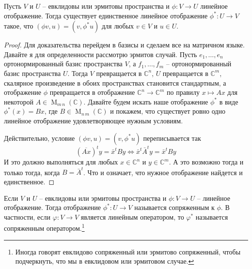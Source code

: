 \begin{claim}
Пусть $V$ и $U$ -- евклидовы или эрмитовы пространства и $\phi\colon V\to U$ линейное отображение. Тогда существует единственное линейное отображение $\phi^*\colon U\to V$ такое, что $(\phi v, u) = (v, \phi^* u)$ для любых $v\in V$ и $u\in U$.
\end{claim}
\begin{proof}
Для доказательства перейдем в базисы и сделаем все на матричном языке. Давайте я для определенности рассмотрю эрмитов случай. Пусть $e_1,\ldots,e_n$ ортонормированный базис пространства $V$, а $f_1,\ldots,f_m$ -- ортонормированный базис пространства $U$. Тогда $V$ превращается в $\mathbb C^n$, $U$ превращается в $\mathbb C^m$, скалярное произведение в обоих пространствах становится стандартным, а отображение $\phi$ превращается в отображение $\mathbb C^n \to \mathbb C^m$ по правилу $x \mapsto Ax$ для некоторой $A\in\operatorname{M}_{m\,n}(\mathbb C)$. Давайте будем искать наше отображение $\phi^*$  в виде $\phi^*(x) = Bx$, где $B\in \operatorname{M}_{n\,m}(\mathbb C)$ и покажем, что существует ровно одно линейное отображение удовлетворяющее нужным условиям.

Действительно, условие $(\phi v, u) = (v, \phi^* u)$ переписывается так
\[
(\overline{Ax})^t y = \bar x^t By\iff \bar x^t \bar A^t y = \bar x^t B y
\]
И это должно выполняться для любых $x\in \mathbb C^n$ и $y\in \mathbb C^m$. А это возможно тогда и только тогда, когда $B = \bar A^t$. Что и означает, что нужное отображение найдется и единственное.
\end{proof}

\begin{definition}
Если $V$ и $U$ -- евклидовы или эрмитовы пространства и $\phi\colon V\to U$ -- линейное отображение. Тогда отображение $\phi^*\colon U\to V$ называется сопряженным к $\phi$. В частности, если $\varphi\colon V\to V$ является линейным оператором, то $\varphi^*$ называется сопряженным оператором.\footnote{Иногда говорят евклидово сопряженный или эрмитово сопряженный, чтобы подчеркнуть, что мы в евклидовом или эрмитовом случае.}
\end{definition}

